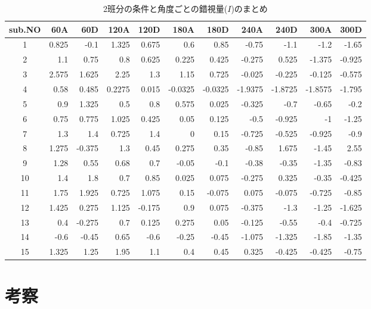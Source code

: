 \documentclass{jlreq}
\begin{document}
\begin{table}[H]
    \centering
    \caption{2班分の条件と角度ごとの錯視量($I$)のまとめ}
    \label{tab:groupIllusion}
    \begin{tabular}{|c|r|r|r|r|r|r|r|r|r|r|}
        \hline
        sub.NO & 60A & 60D & 120A & 120D & 180A & 180D & 240A & 240D & 300A & 300D \\ \hline
        1 & 0.825 & -0.1 & 1.325 & 0.675 & 0.6 & 0.85 & -0.75 & -1.1 & -1.2 & -1.65 \\ \hline
        2 & 1.1 & 0.75 & 0.8 & 0.625 & 0.225 & 0.425 & -0.275 & 0.525 & -1.375 & -0.925 \\ \hline
        3 & 2.575 & 1.625 & 2.25 & 1.3 & 1.15 & 0.725 & -0.025 & -0.225 & -0.125 & -0.575 \\ \hline
        4 & 0.58 & 0.485 & 0.2275 & 0.015 & -0.0325	& -0.0325 & -1.9375	& -1.8725 & -1.8575	& -1.795 \\ \hline
        5 & 0.9	& 1.325	& 0.5 & 0.8	& 0.575	& 0.025	& -0.325 & -0.7	& -0.65	& -0.2 \\ \hline
        6 & 0.75 & 0.775 & 1.025 & 0.425 & 0.05	& 0.125	& -0.5 & -0.925	& -1 & -1.25 \\ \hline
        7 & 1.3	& 1.4 & 0.725 & 1.4	& 0	& 0.15 & -0.725	& -0.525 & -0.925 & -0.9 \\ \hline
        8 & 1.275 & -0.375 & 1.3 & 0.45	& 0.275	& 0.35 & -0.85 & 1.675 & -1.45 & 2.55 \\ \hline
        9 & 1.28 & 0.55	& 0.68 & 0.7 & -0.05 & -0.1	& -0.38	& -0.35	& -1.35	& -0.83 \\ \hline
        10 & 1.4 & 1.8 & 0.7 & 0.85	& 0.025	& 0.075	& -0.275 & 0.325 & -0.35 & -0.425 \\ \hline
        11 & 1.75 & 1.925 & 0.725 & 1.075 & 0.15 & -0.075 & 0.075 & -0.075 & -0.725	& -0.85 \\ \hline
        12 & 1.425 & 0.275 & 1.125 & -0.175	& 0.9 & 0.075 & -0.375 & -1.3 & -1.25 & -1.625 \\ \hline
        13 & 0.4 & -0.275 & 0.7	& 0.125	& 0.275	& 0.05 & -0.125	& -0.55	& -0.4 & -0.725 \\ \hline
        14 & -0.6 & -0.45 & 0.65 & -0.6	& -0.25	& -0.45	& -1.075 & -1.325 & -1.85 & -1.35 \\ \hline
        15 & 1.325 & 1.25 & 1.95 & 1.1 & 0.4 & 0.45 & 0.325	& -0.425 & -0.425 & -0.75 \\ \hline
    \end{tabular}
\end{table}

\section{考察}
\end{document}

